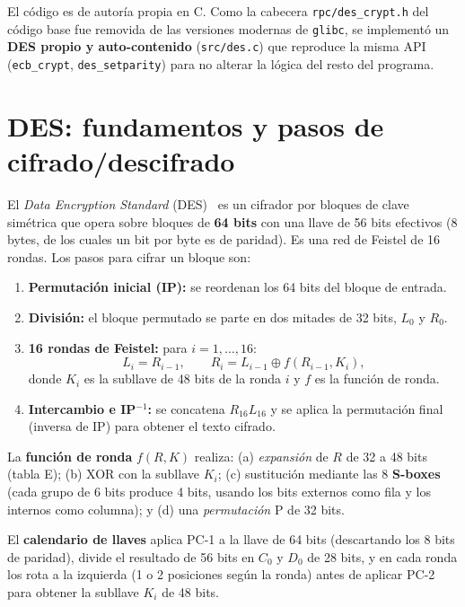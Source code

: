 \documentclass[11pt]{article}
\begin{document}
El código es de autoría propia en C. Como la cabecera \texttt{rpc/des\_crypt.h} del código base fue
removida de las versiones modernas de \texttt{glibc}, se implementó un \textbf{DES propio y
auto-contenido} (\texttt{src/des.c}) que reproduce la misma API (\texttt{ecb\_crypt},
\texttt{des\_setparity}) para no alterar la lógica del resto del programa.

\section{DES: fundamentos y pasos de cifrado/descifrado}
El \emph{Data Encryption Standard} (DES)~\cite{fips463} es un cifrador por bloques de clave simétrica
que opera sobre bloques de \textbf{64 bits} con una llave de 56 bits efectivos (8 bytes, de los cuales
un bit por byte es de paridad). Es una red de Feistel de 16 rondas. Los pasos para cifrar un bloque son:

\begin{enumerate}
  \item \textbf{Permutación inicial (IP):} se reordenan los 64 bits del bloque de entrada.
  \item \textbf{División:} el bloque permutado se parte en dos mitades de 32 bits, $L_0$ y $R_0$.
  \item \textbf{16 rondas de Feistel:} para $i = 1,\dots,16$:
    \[ L_i = R_{i-1}, \qquad R_i = L_{i-1} \oplus f(R_{i-1}, K_i), \]
    donde $K_i$ es la subllave de 48 bits de la ronda $i$ y $f$ es la función de ronda.
  \item \textbf{Intercambio e IP$^{-1}$:} se concatena $R_{16}L_{16}$ y se aplica la permutación final
    (inversa de IP) para obtener el texto cifrado.
\end{enumerate}

La \textbf{función de ronda} $f(R,K)$ realiza: (a) \emph{expansión} de $R$ de 32 a 48 bits (tabla E);
(b) XOR con la subllave $K_i$; (c) sustitución mediante las 8 \textbf{S-boxes} (cada grupo de 6 bits
produce 4 bits, usando los bits externos como fila y los internos como columna); y (d) una
\emph{permutación} P de 32 bits.

El \textbf{calendario de llaves} aplica PC-1 a la llave de 64 bits (descartando los 8 bits de paridad),
divide el resultado de 56 bits en $C_0$ y $D_0$ de 28 bits, y en cada ronda los rota a la izquierda
(1 o 2 posiciones según la ronda) antes de aplicar PC-2 para obtener la subllave $K_i$ de 48 bits.
\end{document}
